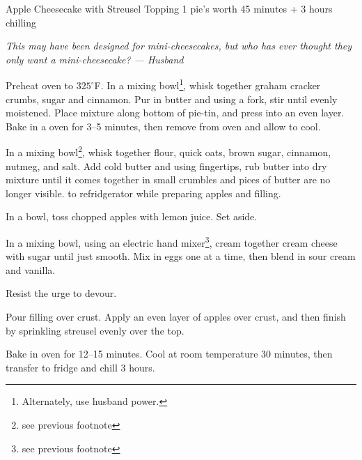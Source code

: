 \documentclass[a4paper]{article}
\begin{document}
\newpage

\begin{recipe}{Apple Cheesecake with Streusel Topping}
  {1 pie's worth}
  {45 minutes + 3 hours chilling}

\freeform \emph{This may have been designed for mini-cheesecakes, but who has ever
thought they only want a mini-cheesecake? --- Husband}


Preheat oven to $325^\circ$F.
In a mixing bowl\footnote{Alternately, use husband power.}, whisk together graham cracker
crumbs, sugar and cinnamon.
Pur in butter and using a fork, stir until evenly moistened.
Place mixture along bottom of pie-tin, and press into an even layer.
Bake in a oven for 3--5 minutes, then remove from oven and allow to cool.



In a mixing bowl\footnote{see previous footnote}, whisk together flour, quick
oats, brown sugar, cinnamon, nutmeg, and salt.
Add cold butter and using fingertips, rub butter into dry mixture until it comes
together in small crumbles and pices of butter are no longer visible.\Transfer
to refridgerator while preparing apples and filling.



In a bowl, toss chopped apples with lemon juice. Set aside.

In a mixing bowl, using an electric hand mixer\footnote{see previous footnote},
cream together cream cheese with sugar until just smooth. Mix in eggs one at a
time, then blend in sour cream and vanilla.

Resist the urge to devour.


Pour filling over crust.
Apply an even layer of apples over crust, and then finish by sprinkling streusel
evenly over the top.

Bake in oven for 12--15 minutes.
Cool at room temperature 30 minutes, then transfer to fridge and chill 3 hours.

\end{recipe}
\end{document}
